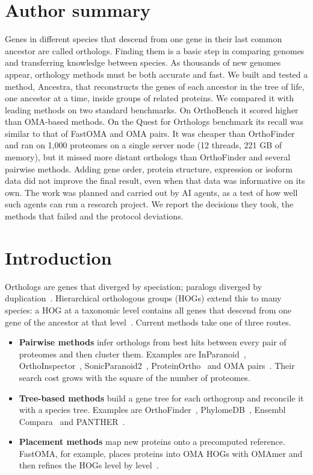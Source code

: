 \section*{Author summary}
Genes in different species that descend from one gene in their last common ancestor are called orthologs. Finding them is a basic step in comparing genomes and transferring knowledge between species. As thousands of new genomes appear, orthology methods must be both accurate and fast. We built and tested a method, Ancestra, that reconstructs the genes of each ancestor in the tree of life, one ancestor at a time, inside groups of related proteins. We compared it with leading methods on two standard benchmarks. On OrthoBench it scored higher than OMA-based methods. On the Quest for Orthologs benchmark its recall was similar to that of FastOMA and OMA pairs. It was cheaper than OrthoFinder and ran on 1,000 proteomes on a single server node (12 threads, 221 GB of memory), but it missed more distant orthologs than OrthoFinder and several pairwise methods. Adding gene order, protein structure, expression or isoform data did not improve the final result, even when that data was informative on its own. The work was planned and carried out by AI agents, as a test of how well such agents can run a research project. We report the decisions they took, the methods that failed and the protocol deviations.

\linenumbers

\section*{Introduction}
Orthologs are genes that diverged by speciation; paralogs diverged by duplication~\cite{altenhoff2016qfo}. Hierarchical orthologous groups (HOGs) extend this to many species: a HOG at a taxonomic level contains all genes that descend from one gene of the ancestor at that level~\cite{altenhoff2013gethogs,sarton2025hogreview}. Current methods take one of three routes.
\begin{itemize}
\item \textbf{Pairwise methods} infer orthologs from best hits between every pair of proteomes and then cluster them. Examples are InParanoid~\cite{remm2001inparanoid,persson2022inparanoid}, OrthoInspector~\cite{nevers2019orthoinspector}, SonicParanoid2~\cite{cosentino2024sonicparanoid2}, ProteinOrtho~\cite{klemm2023proteinortho} and OMA pairs~\cite{altenhoff2024oma}. Their search cost grows with the square of the number of proteomes.
\item \textbf{Tree-based methods} build a gene tree for each orthogroup and reconcile it with a species tree. Examples are OrthoFinder~\cite{emms2019orthofinder,emms2026orthofinder3}, PhylomeDB~\cite{fuentes2022phylomedb}, Ensembl Compara~\cite{vilella2009ensemblcompara} and PANTHER~\cite{thomas2022panther}.
\item \textbf{Placement methods} map new proteins onto a precomputed reference. FastOMA, for example, places proteins into OMA HOGs with OMAmer and then refines the HOGs level by level~\cite{majidian2025fastoma,rossier2021omamer}.
\end{itemize}

